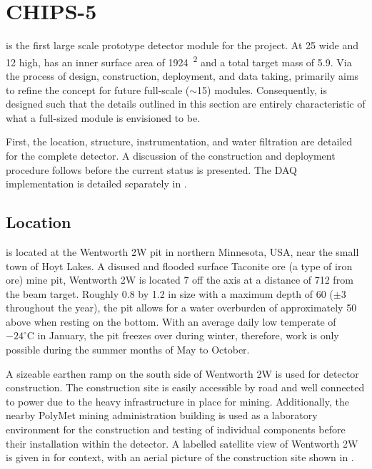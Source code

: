 \section{CHIPS-5} %
\label{sec:chips_detector} %

\chipsfive is the first large scale prototype detector module for the \chips project. At
\SI{25}{} wide and \SI{12}{} high, \chipsfive has an inner surface area of
\SI{1924}{^2} and a total target mass of \SI{5.9}{}. Via the process of design,
construction, deployment, and data taking, \chipsfive primarily aims to refine the \chips concept
for future full-scale ($\sim$\SI{15}{}) modules. Consequently, \chipsfive is designed
such that the details outlined in this section are entirely characteristic of what a full-sized
\chips module is envisioned to be.

First, the location, structure, instrumentation, and water filtration are detailed for the
complete detector. A discussion of the construction and deployment procedure follows before the
current status is presented. The \chipsfive DAQ implementation is detailed separately in
.

\subsection{Location} %
\label{sec:chips_detector_location} %

\chipsfive is located at the Wentworth 2W pit in northern Minnesota, USA, near the small town of
Hoyt Lakes. A disused and flooded surface Taconite ore (a type of iron ore) mine pit, Wentworth 2W
is located \SI{7}{} off the \numi axis at a distance of \SI{712}{} from the
beam target. Roughly \SI{0.8}{} by \SI{1.2}{} in size with a maximum depth of
\SI{60}{} ($\pm$\SI{3}{} throughout the year), the pit allows for a water
overburden of approximately \SI{50}{} above \chipsfive when resting on the bottom. With an
average daily low temperate of $-24^{\circ}\text{C}$ in January, the pit freezes over during
winter, therefore, work is only possible during the summer months of May to October.

A sizeable earthen ramp on the south side of Wentworth 2W is used for detector construction. The
construction site is easily accessible by road and well connected to power due to the heavy
infrastructure in place for mining. Additionally, the nearby PolyMet mining administration
building is used as a laboratory environment for the construction and testing of individual
components before their installation within the detector. A labelled satellite view of Wentworth
2W is given in  for context, with an aerial picture of the construction site
shown in .

